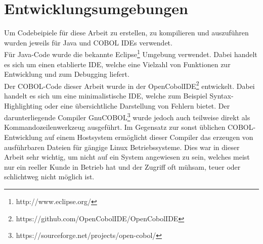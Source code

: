 \section{Entwicklungsumgebungen}
Um Codebeipiele für diese Arbeit zu erstellen, zu kompilieren und auszuführen wurden jeweils für Java und COBOL IDEs verwendet.\\

Für Java-Code wurde die bekannte Eclipse\footnote{http://www.eclipse.org/} Umgebung verwendet. Dabei handelt es sich um einen etablierte IDE, welche eine Vielzahl von Funktionen zur Entwicklung und zum Debugging liefert.\\

Der COBOL-Code dieser Arbeit wurde in der OpenCobolIDE\footnote{https://github.com/OpenCobolIDE/OpenCobolIDE} entwickelt. Dabei handelt es sich um eine minimalistische IDE, welche zum Beispiel Syntax-Highlighting oder eine übersichtliche Darstellung von Fehlern bietet. Der darunterliegende Compiler GnuCOBOL\footnote{https://sourceforge.net/projects/open-cobol/} wurde jedoch auch teilweise direkt als Kommandozeilenwerkzeug ausgeführt. Im Gegensatz zur sonst üblichen COBOL-Entwicklung auf einem Hostsystem ermöglicht dieser Compiler das erzeugen von ausführbaren Dateien für gängige Linux Betriebssysteme. Dies war in dieser Arbeit sehr wichtig, um nicht auf ein System angewiesen zu sein, welches meist nur ein reeller Kunde in Betrieb hat und der Zugriff oft mühsam, teuer oder schlichtweg nicht möglich ist.